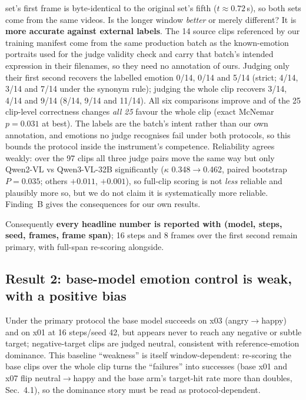 \documentclass[conference]{IEEEtran}
\begin{document}
\begin{itemize}
set's first frame is byte-identical to the original set's fifth ($t\approx0.72$\,s), so both sets come
from the same videos. Is the longer window \emph{better} or merely different? It is \textbf{more
accurate against external labels}. The 14 source clips referenced by our training manifest come from the
same production batch as the known-emotion portraits used for the judge validity check and carry that
batch's intended expression in their filenames, so they need no annotation of ours. Judging only their
first second recovers the labelled emotion 0/14, 0/14 and 5/14 (strict; 4/14, 3/14 and 7/14 under the
synonym rule); judging the whole clip recovers 3/14, 4/14 and 9/14 (8/14, 9/14 and 11/14). All six
comparisons improve and of the 25 clip-level correctness changes \emph{all 25} favour the whole clip
(exact McNemar $p{=}0.031$ at best). The labels are the batch's intent rather than our own annotation, and
emotions no judge recognises fail under both protocols, so this bounds the protocol inside the
instrument's competence. Reliability agrees weakly: over the 97 clips all three judge pairs move the same
way but only Qwen2-VL vs Qwen3-VL-32B significantly ($\kappa$ 0.348$\rightarrow$0.462, paired bootstrap
$P{=}0.035$; others $+0.011$, $+0.001$), so full-clip scoring is not \emph{less} reliable and plausibly
more so, but we do not claim it is systematically more reliable. Finding~B gives the consequences for our own results.
\end{itemize}
Consequently \textbf{every headline number is reported with (model, steps, seed, frames, frame span)};
16 steps and 8 frames over the first second remain primary, with full-span re-scoring alongside.



\subsection{Result 2: base-model emotion control is weak, with a positive bias}
Under the primary protocol the base model succeeds on x03 (angry$\rightarrow$happy) and on x01 at 16
steps/seed 42, but appears never to reach any negative or subtle target; negative-target clips are
judged neutral, consistent with reference-emotion dominance. This baseline ``weakness'' is itself
window-dependent: re-scoring the base clips over the whole clip turns the ``failures'' into
successes (base x01 and x07 flip neutral$\rightarrow$happy and the base arm's target-hit rate more
than doubles, Sec.~4.1), so the dominance story must be read as protocol-dependent.
\end{document}
